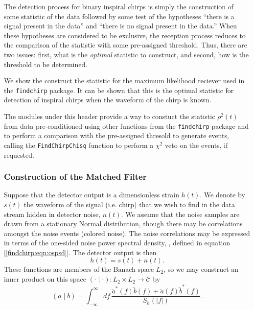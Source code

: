 The detection process for binary inspiral chirps is simply the construction of
some statistic of the data followed by some test of the hypotheses ``there is
a signal present in the data'' and ``there is no signal present in the data.''
When these hypotheses are considered to be exclusive, the reception process
reduces to the comparison of the statistic with some pre-assigned threshold.
Thus, there are two issues: first, what is the \emph{optimal} statistic to
construct, and second, how is the threshold to be determined.

We show the construct the statistic for the maximum likelihood reciever
used in the \texttt{findchirp} package. It can be shown \cite{wz} that this is
the optimal statistic for detection of inspiral chirps when the waveform of
the chirp is known.

The modules under this header provide a way to constuct the statistic
$\rho^2(t)$ from data pre-conditioned using other functions from the
\texttt{findchirp} package and to perform a comparison with the pre-assigned
thresold to generate events, calling the \texttt{FindChirpChisq} function to
perform a $\chi^2$ veto on the events, if requested.

\subsubsection*{Construction of the Matched Filter}

Suppose that the detector output is a dimensionless strain $h(t)$. We denote
by $s(t)$ the waveform of the signal (i.e. chirp) that we wish to find in the
data stream hidden in detector noise, $n(t)$. We assume that the noise samples
are drawn from a stationary Normal distribution, though there may be
correlations amongst the noise events (colored noise). The noise correlations
may be expressed in terms of the one-sided noise power spectral density,
\ospsd, defined in equation [\ref{findchirp:eqn:ospsd}]. The detector output
is then
\begin{equation}
h(t) = s(t) + n(t).
\end{equation}
These functions are members of the Banach space $L_2$, so we may construct an
inner product on this space $(\cdot\mid\cdot) : L_2 \times L_2 \rightarrow
\mathcal{C}$ by
\begin{equation}
  (a\mid b) = \int_{-\infty}^\infty df\,
  \frac{\tilde{a}^\ast(f)\tilde{b}(f)+\tilde{a}(f)\tilde{b}^\ast(f)}
       {S_h(|f|)}.
\end{equation}

